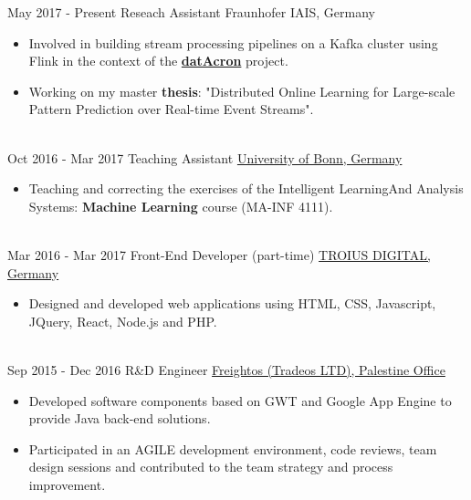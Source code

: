 \documentclass[letterpaper]{twentysecondcv} %
\begin{document}
\begin{twenty} %
	
	\twentyitem
	{May 2017 - }
	{Present}
	{  Reseach Assistant}
	{\href{https://www.iais.fraunhofer.de/?L=1}{}}
	{Fraunhofer IAIS, Germany}
	{\begin{itemize}
			\item Involved in building stream processing pipelines on a Kafka cluster using Flink in the context of the \href{http://www.datacron-project.eu/}{\textbf{datAcron}} project.
			
			\item Working on my master \textbf{thesis}: "Distributed Online Learning for Large-scale Pattern Prediction over Real-time Event Streams".
	\end{itemize}}
\\
		\twentyitem
	{Oct 2016 - }
	{Mar 2017}
	{ Teaching Assistant}
	{}
	{\href{https://www.kdml.iai.uni-bonn.de/teaching/winter-2016-17}{University of Bonn, Germany}}
	 {\begin{itemize}
			\item Teaching and correcting the exercises of the Intelligent Learning ​ And Analysis Systems:\textbf{ Machine Learning} course (MA-INF 4111).
	\end{itemize}}


        \\
	\twentyitem
    	{Mar 2016 -}
		{Mar 2017}
        { Front-End Developer (part-time)}
        {}
        {\href{https://twitter.com/TROIUS_DIGITAL}{TROIUS DIGITAL, Germany}}
        {
        {\begin{itemize}
        \item Designed and developed web applications using HTML, CSS, Javascript, JQuery, React, Node.js and PHP.
    \end{itemize}}
        }
    \\   
    \twentyitem
   		{Sep 2015 -}
		{Dec 2016}
        { R\&D Engineer}
        {}
        {\href{https://www.freightos.com/}{Freightos (Tradeos LTD), Palestine Office}}
        {
        {\begin{itemize}
        \item Developed software components based on GWT and Google App Engine to provide Java back-end solutions.
        \item Participated in an AGILE development environment, code reviews, team design sessions and contributed to the team strategy and process improvement.
        

\end{itemize}}}
\end{twenty}
\end{document}
